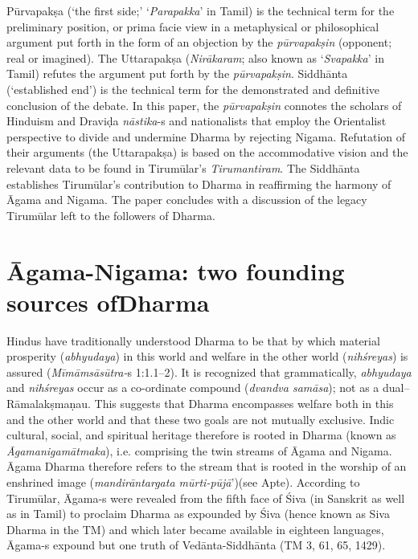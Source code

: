 Pūrvapakṣa (‘the first side;’ ‘\textit{Parapakka}’ in Tamil) is the technical term for the preliminary position, or prima facie view in a metaphysical or philosophical argument put forth in the form of an objection by the \textit{pūrvapakṣin} (opponent; real or imagined). The Uttarapakṣa (\textit{Nirākaram}; also known as ‘\textit{Svapakka}’ in Tamil) refutes the argument put forth by the \textit{pūrvapakṣin}. Siddhānta (‘established end’) is the technical term for the demonstrated and definitive conclusion of the debate. In this paper, the \textit{pūrvapakṣin} connotes the scholars of Hinduism and Draviḍa \textit{nāstika}-s and nationalists that employ the Orientalist perspective to divide and undermine Dharma by rejecting Nigama. Refutation of their arguments (the Uttarapakṣa) is based on the accommodative vision and the relevant data to be found in Tirumūlar’s \textit{Tirumantiram}. The Siddhānta establishes Tirumūlar’s contribution to Dharma in reaffirming the harmony of Āgama and Nigama. The paper concludes with a discussion of the legacy Tirumūlar left to the followers of Dharma.


\section*{Āgama-Nigama: two founding sources of\hfill \break Dharma}

Hindus have traditionally understood Dharma to be that by which material prosperity (\textit{abhyudaya}) in this world and welfare in the other world (\textit{nihśreyas}) is assured (\textit{Mīmāmsāsūtra-}s 1:1.1–2). It is recognized that grammatically, \textit{abhyudaya} and \textit{nihśreyas} occur as a co-ordinate compound (\textit{dvandva samāsa}); not as a dual--Rāmalakṣmaṇau. This suggests that Dharma encompasses welfare both in this and the other world and that these two goals are not mutually exclusive. Indic cultural, social, and spiritual heritage therefore is rooted in Dharma (known as \textit{Āgamanigamātmaka}), i.e. comprising the twin streams of Āgama and Nigama. Āgama Dharma therefore refers to the stream that is rooted in the worship of an enshrined image (\textit{mandirāntargata mūrti-pūjā}’)(see Apte). According to Tirumūlar, Āgama-s were revealed from the fifth face of Śiva (in Sanskrit as well as in Tamil) to proclaim Dharma as expounded by Śiva (hence known as Siva Dharma in the TM) and which later became available in eighteen languages, Āgama-s expound but one truth of Vedānta-Siddhānta (TM 3, 61, 65, 1429).

